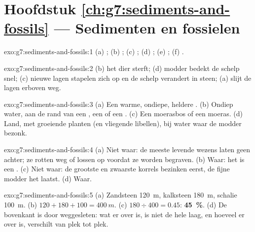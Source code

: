 \section*{Hoofdstuk \ref{ch:g7:sediments-and-fossils} --- Sedimenten en fossielen}

\begin{solution}{exo:g7:sediments-and-fossils:1}
(a) ; (b) ; (c) ; (d) ; (e) ;
(f) .
\end{solution}

\begin{solution}{exo:g7:sediments-and-fossils:2}
(b) het dier sterft; (d) modder bedekt de schelp snel; (c) nieuwe lagen
stapelen zich op en de schelp verandert in steen; (a)  slijt de
lagen erboven weg.
\end{solution}

\begin{solution}{exo:g7:sediments-and-fossils:3}
(a) Een warme, ondiepe, heldere . (b) Ondiep water, aan de rand van een
, een  of een . (c) Een moerasbos of een moeras. (d) Land,
met groeiende planten (en vliegende libellen), bij water waar de modder
bezonk.
\end{solution}

\begin{solution}{exo:g7:sediments-and-fossils:4}
(a) Niet waar: de meeste levende wezens laten geen  achter; ze
rotten weg of lossen op voordat ze worden begraven. (b) Waar: het is een
. (c) Niet waar: de grootste en zwaarste korrels bezinken
eerst, de fijne modder het laatst. (d) Waar.
\end{solution}

\begin{solution}{exo:g7:sediments-and-fossils:5}
(a) Zandsteen \qty{120}{m}, kalksteen \qty{180}{m}, schalie \qty{100}{m}.
(b) $120 + 180 + 100 = \qty{400}{m}$. (c) $180 \div 400 = 0.45$:
\textbf{45~\%}. (d) De bovenkant is door  weggesleten: wat er over
is, is niet de hele laag, en hoeveel er over is, verschilt van plek tot
plek.
\end{solution}

